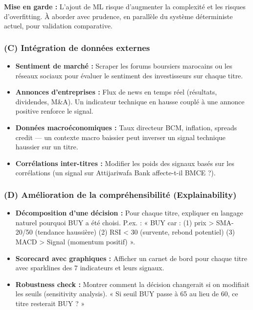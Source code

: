 \documentclass{rapportENSIAS} %
\begin{document}
\vspace{0.2cm}
\noindent
\textbf{Mise en garde :} L'ajout de ML risque d'augmenter la complexité et les risques d'overfitting. À aborder avec prudence, en parallèle du système déterministe actuel, pour validation comparative.

\subsubsection*{(C) Intégration de données externes}

\noindent
\begin{itemize}
    \item \textbf{Sentiment de marché :} Scraper les forums boursiers marocains ou les réseaux sociaux pour évaluer le sentiment des investisseurs sur chaque titre.
    \item \textbf{Annonces d'entreprises :} Flux de news en temps réel (résultats, dividendes, M\&A). Un indicateur technique en hausse couplé à une annonce positive renforce le signal.
    \item \textbf{Données macroéconomiques :} Taux directeur BCM, inflation, spreads credit — un contexte macro baissier peut inverser un signal technique haussier sur un titre.
    \item \textbf{Corrélations inter-titres :} Modifier les poids des signaux basés sur les corrélations (un signal sur Attijariwafa Bank affecte-t-il BMCE ?).
\end{itemize}

\subsubsection*{(D) Amélioration de la compréhensibilité (Explainability)}

\noindent
\begin{itemize}
    \item \textbf{Décomposition d'une décision :} Pour chaque titre, expliquer en langage naturel pourquoi BUY a été choisi. P.ex. : « BUY car : (1) prix > SMA-20/50 (tendance haussière) (2) RSI < 30 (survente, rebond potentiel) (3) MACD > Signal (momentum positif) ».
    \item \textbf{Scorecard avec graphiques :} Afficher un carnet de bord pour chaque titre avec sparklines des 7 indicateurs et leurs signaux.
    \item \textbf{Robustness check :} Montrer comment la décision changerait si on modifiait les seuils (sensitivity analysis). « Si seuil BUY passe à 65 au lieu de 60, ce titre resterait BUY ? »
\end{itemize}
\end{document}
